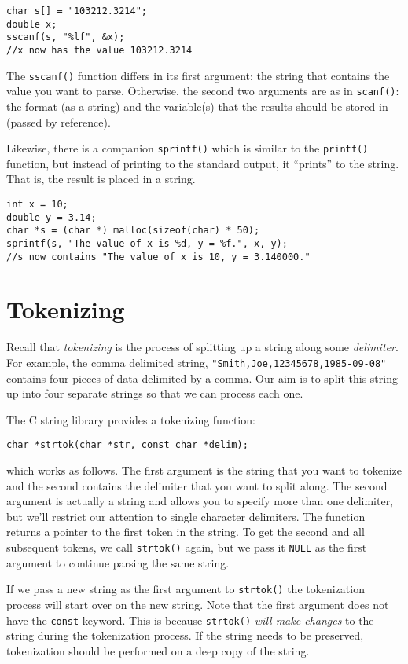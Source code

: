 \begin{verbatim}
char s[] = "103212.3214";
double x;
sscanf(s, "%lf", &x);
//x now has the value 103212.3214
\end{verbatim}

The \texttt{sscanf()} function differs in its first 
argument: the string that contains the value you want to parse.
Otherwise, the second two arguments are as in \texttt{scanf()}:
the format (as a string) and the variable(s) that the results
should be stored in (passed by reference).

Likewise, there is a companion \texttt{sprintf()} which
is similar to the \texttt{printf()} function, but instead
of printing to the standard output, it ``prints'' to the string.
That is, the result is placed in a string.

\begin{verbatim}
int x = 10;
double y = 3.14;
char *s = (char *) malloc(sizeof(char) * 50);
sprintf(s, "The value of x is %d, y = %f.", x, y);
//s now contains "The value of x is 10, y = 3.140000."
\end{verbatim}

\section{Tokenizing}

Recall that \emph{tokenizing} is the process of splitting
up a string along some \emph{delimiter}.  For example, 
the comma delimited string, \texttt{"Smith,Joe,12345678,1985-09-08"}
contains four pieces of data delimited by a comma.  
Our aim is to split this string up into four separate 
strings so that we can process each one.

The C string library provides a tokenizing function:

\texttt{char *strtok(char *str, const char *delim);}

which works as follows.  The first argument is the string
that you want to tokenize and the second contains the
delimiter that you want to split along.  The second argument
is actually a string and allows you to specify more than one
delimiter, but we'll restrict our attention to single 
character delimiters.  The function returns a pointer to
the first token in the string.  To get the second and
all subsequent tokens, we call \texttt{strtok()} 
again, but we pass it \texttt{NULL} as the first
argument to continue parsing the same string. 

If we pass a new string as the first argument to 
\texttt{strtok()} the tokenization process will
start over on the new string.  Note that the first
argument does not have the \texttt{const} keyword.
This is because \texttt{strtok()} \emph{will make
changes} to the string during the tokenization process.
If the string needs to be preserved, tokenization should
be performed on a deep copy of the string.

